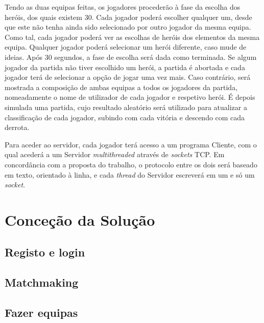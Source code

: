\documentclass[a4paper]{article}
\begin{document}
\par Tendo as duas equipas feitas, os jogadores procederão à fase da escolha dos heróis, dos quais existem 30. Cada jogador poderá escolher qualquer um, desde que este não tenha ainda sido selecionado por outro jogador da mesma equipa. Como tal, cada jogador poderá ver as escolhas de heróis dos elementos da mesma equipa. Qualquer jogador poderá selecionar um herói diferente, caso mude de ideias. Após 30 segundos, a fase de escolha será dada como terminada. Se algum jogador da partida não tiver escolhido um herói, a partida é abortada e cada jogador terá de selecionar a opção de jogar uma vez mais. Caso contrário, será mostrada a composição de ambas equipas a todos os jogadores da partida, nomeadamente o nome de utilizador de cada jogador e respetivo herói. É depois simulada uma partida, cujo resultado aleatório será utilizado para atualizar a classificação de cada jogador, subindo com cada vitória e descendo com cada derrota.

\par Para aceder ao servidor, cada jogador terá acesso a um programa Cliente, com o qual acederá a um Servidor \textit{multithreaded} através de \textit{sockets} TCP. Em concordância com a proposta do trabalho, o protocolo entre os dois será baseado em texto, orientado à linha, e cada \textit{thread} do Servidor escreverá em um e só um \textit{socket}.


\pagebreak
\clearpage

\section{Conceção da Solução}
\label{sec:3}

\subsection{Registo e login}

\hspace{3mm} 



\subsection{Matchmaking}

\hspace{3mm} 




\subsection{Fazer equipas}
\end{document}
